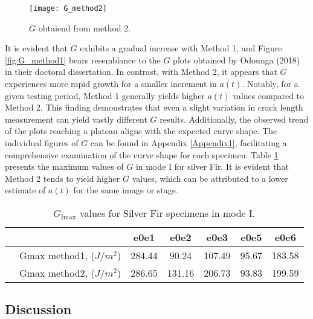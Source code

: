 \begin{figure}[htp]
	\centering
	\texttt{[image: G\_method2]}
	\caption{$G$ obtaiend from method 2.}
	\label{fig:G_method2}
\end{figure}

It is evident that $G$ exhibits a gradual increase with Method 1, and Figure \ref{fig:G_method1} bears resemblance to the $G$ plots obtained by Odounga (2018) in their doctoral dissertation. In contrast, with Method 2, it appears that $G$ experiences more rapid growth for a smaller increment in $a(t)$. Notably, for a given testing period, Method 1 generally yields higher $a(t)$ values compared to Method 2. This finding demonstrates that even a slight variation in crack length measurement can yield vastly different $G$ results. Additionally, the observed trend of the plots reaching a plateau aligns with the expected curve shape.
The individual figures of $G$ can be found in Appendix \ref{Appendix1}, facilitating a comprehensive examination of the curve shape for each specimen.
Table \ref{fig:tableG1} presents the maximum values of $G$ in mode I for silver Fir. It is evident that Method 2 tends to yield higher $G$ values, which can be attributed to a lower estimate of $a(t)$ for the same image or stage.

\begin{table} [H]
	\centering
	\begin{tabular}{ccccccc}
		\toprule %
		&  & e0e1 & e0e2 & e0e3 & e0e5 & e0e6\\\midrule
		& Gmax method1, ($J/m^2$) & 284.44 & 90.24 & 107.49 & 95.67 & 183.58 \\\midrule
		& Gmax method2, ($J/m^2$) & 286.65 & 131.16 & 206.73 & 93.83 & 199.59 \\\midrule
	\end{tabular}
	\caption{$G_\text{Imax}$ values for Silver Fir specimens in mode I.}
	\label{fig:tableG1}
\end{table}

\subsection{Discussion}

